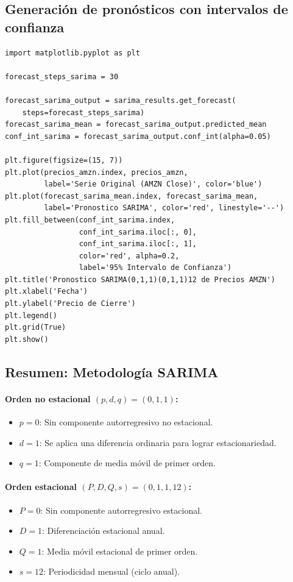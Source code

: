 \documentclass[12pt, a4paper]{article}
\begin{document}
\subsection{Generación de pronósticos con intervalos de confianza}

\begin{lstlisting}
import matplotlib.pyplot as plt

forecast_steps_sarima = 30

forecast_sarima_output = sarima_results.get_forecast(
    steps=forecast_steps_sarima)
forecast_sarima_mean = forecast_sarima_output.predicted_mean
conf_int_sarima = forecast_sarima_output.conf_int(alpha=0.05)

plt.figure(figsize=(15, 7))
plt.plot(precios_amzn.index, precios_amzn,
         label='Serie Original (AMZN Close)', color='blue')
plt.plot(forecast_sarima_mean.index, forecast_sarima_mean,
         label='Pronostico SARIMA', color='red', linestyle='--')
plt.fill_between(conf_int_sarima.index,
                 conf_int_sarima.iloc[:, 0],
                 conf_int_sarima.iloc[:, 1],
                 color='red', alpha=0.2,
                 label='95% Intervalo de Confianza')
plt.title('Pronostico SARIMA(0,1,1)(0,1,1)12 de Precios AMZN')
plt.xlabel('Fecha')
plt.ylabel('Precio de Cierre')
plt.legend()
plt.grid(True)
plt.show()
\end{lstlisting}

\subsection{Resumen: Metodología SARIMA}

\paragraph{Orden no estacional $(p,d,q)=(0,1,1)$:}
\begin{itemize}
  \item $p=0$: Sin componente autorregresivo no estacional.
  \item $d=1$: Se aplica una diferencia ordinaria para lograr estacionariedad.
  \item $q=1$: Componente de media móvil de primer orden.
\end{itemize}

\paragraph{Orden estacional $(P,D,Q,s)=(0,1,1,12)$:}
\begin{itemize}
  \item $P=0$: Sin componente autorregresivo estacional.
  \item $D=1$: Diferenciación estacional anual.
  \item $Q=1$: Media móvil estacional de primer orden.
  \item $s=12$: Periodicidad mensual (ciclo anual).
\end{itemize}
\end{document}
